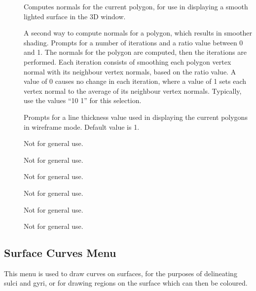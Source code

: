 \begin{description}
\item[]  Computes normals for the
     current polygon, for use in displaying a smooth lighted surface in
     the 3D window. 
\item[]  A second way to compute
     normals for a polygon, which results in smoother shading.
     Prompts for a number of
     iterations and a ratio value between 0 and 1.  The normals for the
     polygon are computed, then the iterations are performed.  Each
     iteration consists of smoothing each polygon vertex normal with
     its neighbour vertex normals, based on the ratio value.  A value
     of 0 causes no change in each iteration, where a value of 1
     sets each vertex normal to the average of its neighbour vertex
     normals.  Typically, use the values ``10 1'' for this selection.
\item[]  Prompts for a line thickness
     value used in displaying the current polygons in wireframe mode.
     Default value is 1.
\item[]  Not for general use.
\item[]  Not for general use.
\item[]  Not for general use.
\item[]  Not for general use.
\item[]  Not for general use.
\item[]  Not for general use.
\end{description}

\subsection{Surface Curves Menu}

This menu is used to draw curves on surfaces, for the purposes of
delineating sulci and gyri, or for drawing regions on the surface which
can then be coloured.

